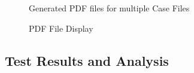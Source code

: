 \begin{center}
\begin{figure}[h]
\caption{Generated PDF files for multiple Case Files}

\end{figure}
\end{center}

\begin{center}
\begin{figure}[h]
\caption{PDF File Display}

\end{figure}
\end{center}

\subsection{Test Results and Analysis}

